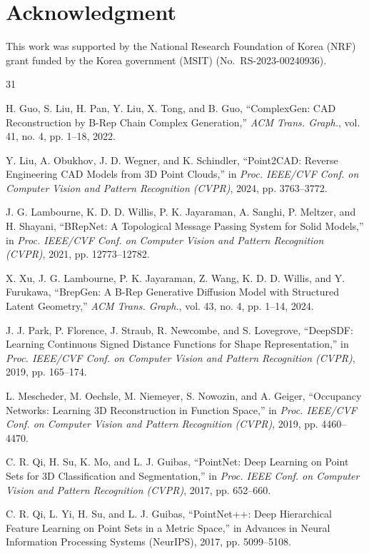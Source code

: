 \documentclass{ieeeaccess}
\begin{document}
\section*{Acknowledgment}
This work was supported by the National Research Foundation of Korea (NRF) grant funded by the Korea government (MSIT) (No.\ RS-2023-00240936).

\begin{thebibliography}{31}

H. Guo, S. Liu, H. Pan, Y. Liu, X. Tong, and B. Guo,
``ComplexGen: CAD Reconstruction by B-Rep Chain Complex Generation,''
\emph{ACM Trans. Graph.}, vol. 41, no. 4, pp. 1--18, 2022.

Y. Liu, A. Obukhov, J. D. Wegner, and K. Schindler,
``Point2CAD: Reverse Engineering CAD Models from 3D Point Clouds,''
in \emph{Proc. IEEE/CVF Conf. on Computer Vision and Pattern Recognition (CVPR)}, 2024, pp. 3763--3772.

J. G. Lambourne, K. D. D. Willis, P. K. Jayaraman, A. Sanghi, P. Meltzer, and H. Shayani,
``BRepNet: A Topological Message Passing System for Solid Models,''
in \emph{Proc. IEEE/CVF Conf. on Computer Vision and Pattern Recognition (CVPR)}, 2021, pp. 12773--12782.

X. Xu, J. G. Lambourne, P. K. Jayaraman, Z. Wang, K. D. D. Willis, and Y. Furukawa,
``BrepGen: A B-Rep Generative Diffusion Model with Structured Latent Geometry,''
\emph{ACM Trans. Graph.}, vol. 43, no. 4, pp. 1--14, 2024.

J. J. Park, P. Florence, J. Straub, R. Newcombe, and S. Lovegrove,
``DeepSDF: Learning Continuous Signed Distance Functions for Shape Representation,''
in \emph{Proc. IEEE/CVF Conf. on Computer Vision and Pattern Recognition (CVPR)}, 2019, pp. 165--174.

L. Mescheder, M. Oechsle, M. Niemeyer, S. Nowozin, and A. Geiger,
``Occupancy Networks: Learning 3D Reconstruction in Function Space,''
in \emph{Proc. IEEE/CVF Conf. on Computer Vision and Pattern Recognition (CVPR)}, 2019, pp. 4460--4470.

C. R. Qi, H. Su, K. Mo, and L. J. Guibas,
``PointNet: Deep Learning on Point Sets for 3D Classification and Segmentation,''
in \emph{Proc. IEEE Conf. on Computer Vision and Pattern Recognition (CVPR)}, 2017, pp. 652--660.

C. R. Qi, L. Yi, H. Su, and L. J. Guibas,
``PointNet++: Deep Hierarchical Feature Learning on Point Sets in a Metric Space,''
in Advances in Neural Information Processing Systems (NeurIPS), 2017, pp. 5099--5108.


\end{thebibliography}
\end{document}
